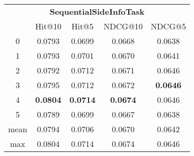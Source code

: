 \documentclass{article}
\begin{document}
 

\begin{tabular}{c|cccc}

\multicolumn{5}{c}{\textbf{SequentialSideInfoTask}} \\
\noalign{\smallskip}
\noalign{\smallskip}
\toprule
\multicolumn{1}{c}{Template ID}	&	\multicolumn{1}{|c}{Hit@10}	&	\multicolumn{1}{c}{Hit@5}	&	\multicolumn{1}{c}{NDCG@10}	&	\multicolumn{1}{c}{NDCG@5}\\
\midrule
0	&	0.0793	&	0.0699	&	0.0668	&	0.0638\\
1	&	0.0793	&	0.0701	&	0.0670	&	0.0641\\
2	&	0.0792	&	0.0712	&	0.0671	&	0.0646\\
3	&	0.0795	&	0.0712	&	0.0672	&	\textbf{0.0646}\\
4	&	\textbf{0.0804}	&	\textbf{0.0714}	&	\textbf{0.0674}	&	0.0646\\
5	&	0.0789	&	0.0699	&	0.0667	&	0.0638\\
\midrule
mean	&	0.0794	&	0.0706	&	0.0670	&	0.0642\\
max	&	0.0804	&	0.0714	&	0.0674	&	0.0646\\
\bottomrule

\end{tabular}
\end{document}
